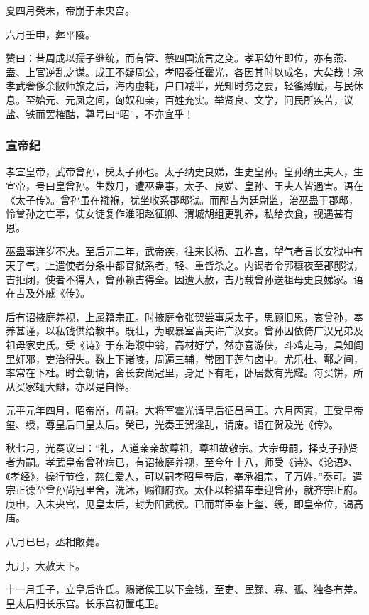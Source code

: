 \documentclass[]{article}
\begin{document}
夏四月癸未，帝崩于未央宫。

六月壬申，葬平陵。

赞曰：昔周成以孺子继统，而有管、蔡四国流言之变。孝昭幼年即位，亦有燕、盍、上官逆乱之谋。成王不疑周公，孝昭委任霍光，各因其时以成名，大矣哉！承孝武奢侈余敝师旅之后，海内虚耗，户口减半，光知时务之要，轻徭薄赋，与民休息。至始元、元凤之间，匈奴和亲，百姓充实。举贤良、文学，问民所疾苦，议盐、铁而罢榷酤，尊号曰``昭''，不亦宜乎！

\hypertarget{header-n731}{%
\subsubsection{宣帝纪}\label{header-n731}}

孝宣皇帝，武帝曾孙，戾太子孙也。太子纳史良娣，生史皇孙。皇孙纳王夫人，生宣帝，号曰皇曾孙。生数月，遭巫蛊事，太子、良娣、皇孙、王夫人皆遇害。语在《太子传》。曾孙虽在襁褓，犹坐收系郡邸狱。而邴吉为廷尉监，治巫蛊于郡邸，怜曾孙之亡辜，使女徒复作淮阳赵征卿、渭城胡组更乳养，私给衣食，视遇甚有恩。

巫蛊事连岁不决。至后元二年，武帝疾，往来长杨、五柞宫，望气者言长安狱中有天子气，上遣使者分条中都官狱系者，轻、重皆杀之。内谒者令郭穰夜至郡邸狱，吉拒闭，使者不得入，曾孙赖吉得全。因遭大赦，吉乃载曾孙送祖母史良娣家。语在吉及外戚《传》。

后有诏掖庭养视，上属籍宗正。时掖庭令张贺尝事戾太子，思顾旧恩，哀曾孙，奉养甚谨，以私钱供给教书。既壮，为取暴室啬夫许广汉女。曾孙因依倚广汉兄弟及祖母家史氏。受《诗》于东海澓中翁，高材好学，然亦喜游侠，斗鸡走马，具知闾里奸邪，吏治得失。数上下诸陵，周遍三辅，常困于莲勺卤中。尤乐杜、鄠之间，率常在下杜。时会朝请，舍长安尚冠里，身足下有毛，卧居数有光耀。每买饼，所从买家辄大雠，亦以是自怪。

元平元年四月，昭帝崩，毋嗣。大将军霍光请皇后征昌邑王。六月丙寅，王受皇帝玺、绶，尊皇后曰皇太后。癸已，光奏王贺淫乱，请废。语在贺及光《传》。

秋七月，光奏议曰：``礼，人道亲亲故尊祖，尊祖故敬宗。大宗毋嗣，择支子孙贤者为嗣。孝武皇帝曾孙病已，有诏掖庭养视，至今年十八，师受《诗》、《论语》、《孝经》，操行节俭，慈仁爱人，可以嗣孝昭皇帝后，奉承祖宗，子万姓。''奏可。遣宗正德至曾孙尚冠里舍，洗沐，赐御府衣。太仆以軨猎车奉迎曾孙，就齐宗正府。庚申，入未央宫，见皇太后，封为阳武侯。已而群臣奉上玺、绶，即皇帝位，谒高庙。

八月已巳，丞相敞薨。

九月，大赦天下。

十一月壬子，立皇后许氏。赐诸侯王以下金钱，至吏、民鳏、寡、孤、独各有差。皇太后归长乐宫。长乐宫初置屯卫。
\end{document}
